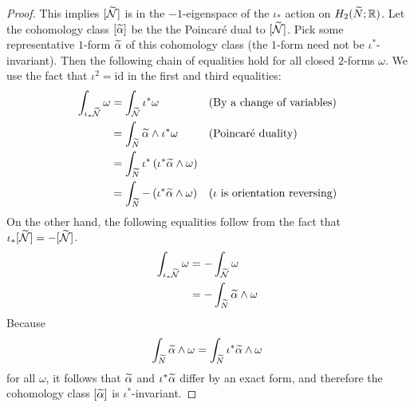 \begin{proof}
  This implies $[\widetilde{\mathcal{N}}]$ is in the $-1$-eigenspace of the $\iota_{\ast}$ action on $H_2(\widetilde{N}; \mathbb{R})$.
  Let the cohomology class $[\widetilde{\alpha}]$ be the the Poincar\'e dual to $[\widetilde{\mathcal{N}}]$.
  Pick some representative $1$-form $\widetilde{\alpha}$ of this cohomology class (the $1$-form need not be $\iota^{\ast}$-invariant).
  Then the following chain of equalities hold for all closed $2$-forms $\omega$.
  We use the fact that $\iota^2= \mathrm{id}$ in the first and third equalities:
  \begin{align*}
    \int_{\iota_{\ast}\widetilde{\mathcal{N}}} \omega &= \int_{\widetilde{\mathcal{N}}} \iota^{\ast}\omega &&\text{(By a change of variables)} \\
                                     &= \int_{\widetilde{N}} \widetilde{\alpha} \wedge \iota^{\ast} \omega &&\text{(Poincar\'e duality)} \\
                                     &=\int_{\widetilde{N}} \iota^{\ast} \left( \iota^{\ast}\widetilde{\alpha} \wedge \omega \right) \\
    &= \int_{\widetilde{N}} - \left( \iota^{\ast} \widetilde{\alpha} \wedge \omega \right) &&\text{($\iota$ is orientation reversing)}
  \end{align*}
  On the other hand, the following equalities follow from the fact that $\iota_{\ast}[\widetilde{\mathcal{N}}] = -[\widetilde{\mathcal{N}}]$.
  \begin{align*}
    \int_{\iota_{\ast}\widetilde{\mathcal{N}}} \omega &= - \int_{\widetilde{\mathcal{N}}} \omega \\
                              &= - \int_{\widetilde{N}} \widetilde{\alpha} \wedge \omega
  \end{align*}
  Because $$\int_{\widetilde{N}}\widetilde{\alpha}\wedge\omega=\int_{\widetilde{N}}\iota^\ast\widetilde{\alpha}\wedge\omega$$ for all $\omega$, it follows that $\widetilde{\alpha}$ and $\iota^{\ast}\widetilde{\alpha}$ differ by an exact form, and therefore the cohomology class $[\widetilde{\alpha}]$ is
  $\iota^{\ast}$-invariant.
\end{proof}

